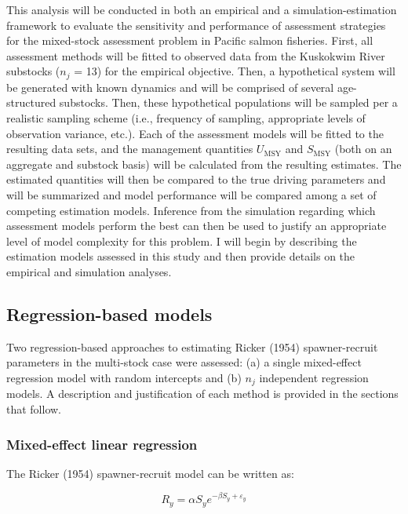 \documentclass[12pt,]{book}
\theoremstyle{definition}
\theoremstyle{definition}
\theoremstyle{definition}
\theoremstyle{remark}
\begin{document}
This analysis will be conducted in both an empirical and a
simulation-estimation framework to evaluate the sensitivity and
performance of assessment strategies for the mixed-stock assessment
problem in Pacific salmon fisheries. First, all assessment methods will
be fitted to observed data from the Kuskokwim River substocks (\(n_j\) =
13) for the empirical objective. Then, a hypothetical system will be
generated with known dynamics and will be comprised of several
age-structured substocks. Then, these hypothetical populations will be
sampled per a realistic sampling scheme (i.e., frequency of sampling,
appropriate levels of observation variance, etc.). Each of the
assessment models will be fitted to the resulting data sets, and the
management quantities \(U_{\text{MSY}}\) and \(S_{\text{MSY}}\) (both on
an aggregate and substock basis) will be calculated from the resulting
estimates. The estimated quantities will then be compared to the true
driving parameters and will be summarized and model performance will be
compared among a set of competing estimation models. Inference from the
simulation regarding which assessment models perform the best can then
be used to justify an appropriate level of model complexity for this
problem. I will begin by describing the estimation models assessed in
this study and then provide details on the empirical and simulation
analyses.

\subsection{Regression-based models}\label{regression-based-models}

Two regression-based approaches to estimating Ricker (1954)
spawner-recruit parameters in the multi-stock case were assessed: (a) a
single mixed-effect regression model with random intercepts and (b)
\(n_j\) independent regression models. A description and justification
of each method is provided in the sections that follow.

\subsubsection{Mixed-effect linear
regression}\label{mixed-effect-linear-regression}

The Ricker (1954) spawner-recruit model can be written as:

\begin{equation}
  R_y=\alpha S_y e^{-\beta S_y + \varepsilon_y}
  \label{eq:basic-ricker}
\end{equation}
\end{document}
